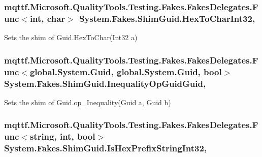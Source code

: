 \hypertarget{class_system_1_1_fakes_1_1_shim_guid_a2283a6468909a1d013542fe70c55eac0}{
\subsubsection[{Hex\-To\-Char\-Int32}]{\setlength{\rightskip}{0pt plus 5cm}mqttf.\-Microsoft.\-Quality\-Tools.\-Testing.\-Fakes.\-Fakes\-Delegates.\-Func$<$int, char$>$ System.\-Fakes.\-Shim\-Guid.\-Hex\-To\-Char\-Int32\hspace{0.3cm}{\ttfamily [static]}, {\ttfamily [set]}}}\label{class_system_1_1_fakes_1_1_shim_guid_a2283a6468909a1d013542fe70c55eac0}


Sets the shim of Guid.\-Hex\-To\-Char(\-Int32 a)

\hypertarget{class_system_1_1_fakes_1_1_shim_guid_a64a9ce7b0d861689099d237657d7ee94}{
\subsubsection[{Inequality\-Op\-Guid\-Guid}]{\setlength{\rightskip}{0pt plus 5cm}mqttf.\-Microsoft.\-Quality\-Tools.\-Testing.\-Fakes.\-Fakes\-Delegates.\-Func$<$global.\-System.\-Guid, global.\-System.\-Guid, bool$>$ System.\-Fakes.\-Shim\-Guid.\-Inequality\-Op\-Guid\-Guid\hspace{0.3cm}{\ttfamily [static]}, {\ttfamily [set]}}}\label{class_system_1_1_fakes_1_1_shim_guid_a64a9ce7b0d861689099d237657d7ee94}


Sets the shim of Guid.\-op\-\_\-\-Inequality(\-Guid a, Guid b)

\hypertarget{class_system_1_1_fakes_1_1_shim_guid_af626e6af0ad6ee3ab56830fd79869944}{
\subsubsection[{Is\-Hex\-Prefix\-String\-Int32}]{\setlength{\rightskip}{0pt plus 5cm}mqttf.\-Microsoft.\-Quality\-Tools.\-Testing.\-Fakes.\-Fakes\-Delegates.\-Func$<$string, int, bool$>$ System.\-Fakes.\-Shim\-Guid.\-Is\-Hex\-Prefix\-String\-Int32\hspace{0.3cm}{\ttfamily [static]}, {\ttfamily [set]}}}\label{class_system_1_1_fakes_1_1_shim_guid_af626e6af0ad6ee3ab56830fd79869944}


